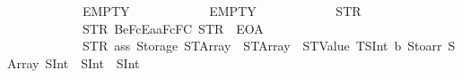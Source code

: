 \begin{isabellebody}
\ \ \ \ \ \ \ \ \ \ \ \ EMPTY\isanewline
\ \ \ \ \ \ \ \ \ \ \ \ EMPTY\isanewline
\ \ \ \ \ \ \ \ \ \ \ \ {\isacharparenleft}{\kern0pt}STR\ {\isacharprime}{\kern0pt}{\isacharprime}{\kern0pt}{}{\isacharprime}{\kern0pt}{\isacharprime}{\kern0pt}{\isacharparenright}{\kern0pt}\isanewline
\ \ \ \ \ \ \ \ \ \ \ \ {\isacharbrackleft}{\kern0pt}{\isacharparenleft}{\kern0pt}STR\ {\isacharprime}{\kern0pt}{\isacharprime}{\kern0pt}{}{}{}Be{}{}{}{}FcEa{}{}aF{}{}{}{}{}{}{}{}{}c{}{}F{}{}{}{}{}{}C{}{}{}{\isacharprime}{\kern0pt}{\isacharprime}{\kern0pt}{\isacharcomma}{\kern0pt}\ STR\ {\isacharprime}{\kern0pt}{\isacharprime}{\kern0pt}{}{}{}{\isacharprime}{\kern0pt}{\isacharprime}{\kern0pt}{\isacharcomma}{\kern0pt}\ EOA{\isacharcomma}{\kern0pt}\ {}{\isacharparenright}{\kern0pt}{\isacharbrackright}{\kern0pt}\isanewline
\ \ \ \ \ \ \ \ \ \ \ \ {\isacharbrackleft}{\kern0pt}{\isacharparenleft}{\kern0pt}STR\ {\isacharprime}{\kern0pt}{\isacharprime}{\kern0pt}a{\isacharunderscore}{\kern0pt}s{}{\isacharunderscore}{\kern0pt}{}{}{\isacharunderscore}{\kern0pt}s{}{\isacharprime}{\kern0pt}{\isacharprime}{\kern0pt}{\isacharcomma}{\kern0pt}\ {\isacharparenleft}{\kern0pt}Storage\ {\isacharparenleft}{\kern0pt}STArray\ {}\ {\isacharparenleft}{\kern0pt}STArray\ {}\ {\isacharparenleft}{\kern0pt}STValue\ {\isacharparenleft}{\kern0pt}TSInt\ b{}{\isacharparenright}{\kern0pt}{\isacharparenright}{\kern0pt}{\isacharparenright}{\kern0pt}{\isacharparenright}{\kern0pt}{\isacharcomma}{\kern0pt}\ Stoarr\ {\isacharbrackleft}{\kern0pt}SArray\ {\isacharbrackleft}{\kern0pt}SInt\ {\isacharparenleft}{\kern0pt}{\isacharparenleft}{\kern0pt}{}{}{\isacharparenright}{\kern0pt}{\isacharparenright}{\kern0pt}{\isacharcomma}{\kern0pt}\ SInt\ {\isacharparenleft}{\kern0pt}{\isacharparenleft}{\kern0pt}{\isacharminus}{\kern0pt}{}{}{\isacharparenright}{\kern0pt}{\isacharparenright}{\kern0pt}{\isacharcomma}{\kern0pt}\ SInt\ {\isacharparenleft}{\kern0pt}{}{}{\isacharparenright}{\kern0pt}{\isacharbrackright}{\kern0pt}{\isacharbrackright}{\kern0pt}{\isacharparenright}{\kern0pt}{\isacharparenright}{\kern0pt}{\isacharcomma}{\kern0pt}\isanewline

\end{isabellebody}
